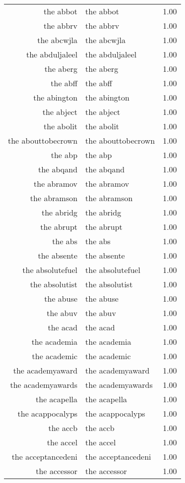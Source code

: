 \begin{table}[ht]
\begin{tabular}{rlr}
  the abbot & the abbot & 1.00 \\ 
  the abbrv & the abbrv & 1.00 \\ 
  the abcwjla & the abcwjla & 1.00 \\ 
  the abduljaleel & the abduljaleel & 1.00 \\ 
  the aberg & the aberg & 1.00 \\ 
  the abff & the abff & 1.00 \\ 
  the abington & the abington & 1.00 \\ 
  the abject & the abject & 1.00 \\ 
  the abolit & the abolit & 1.00 \\ 
  the abouttobecrown & the abouttobecrown & 1.00 \\ 
  the abp & the abp & 1.00 \\ 
  the abqand & the abqand & 1.00 \\ 
  the abramov & the abramov & 1.00 \\ 
  the abramson & the abramson & 1.00 \\ 
  the abridg & the abridg & 1.00 \\ 
  the abrupt & the abrupt & 1.00 \\ 
  the abs & the abs & 1.00 \\ 
  the absente & the absente & 1.00 \\ 
  the absolutefuel & the absolutefuel & 1.00 \\ 
  the absolutist & the absolutist & 1.00 \\ 
  the abuse & the abuse & 1.00 \\ 
  the abuv & the abuv & 1.00 \\ 
  the acad & the acad & 1.00 \\ 
  the academia & the academia & 1.00 \\ 
  the academic & the academic & 1.00 \\ 
  the academyaward & the academyaward & 1.00 \\ 
  the academyawards & the academyawards & 1.00 \\ 
  the acapella & the acapella & 1.00 \\ 
  the acappocalyps & the acappocalyps & 1.00 \\ 
  the accb & the accb & 1.00 \\ 
  the accel & the accel & 1.00 \\ 
  the acceptancedeni & the acceptancedeni & 1.00 \\ 
  the accessor & the accessor & 1.00 \\ 

\end{tabular}
\end{table}
